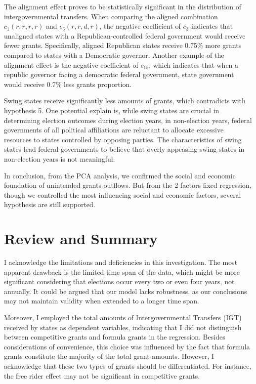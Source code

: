 
The alignment effect proves to be statistically significant in the distribution of intergovernmental transfers. When comparing the aligned combination $c_1(r, r, r, r)$ and $c_3(r, r, d, r)$, the negative coefficient of $c_3$ indicates that unaligned states with a Republican-controlled federal government would receive fewer grants. Specifically, aligned Republican states receive 0.75\% more grants compared to states with a Democratic governor. Another example of the alignment effect is the negative coefficient of $c_{15}$, which indicates that when a republic governor facing a democratic federal government, state government would receive 0.7\% less grants proportion.

Swing states receive significantly less amounts of grants, which contradicts with hypothesis 5. One potential explain is, while swing states are crucial in determining election outcomes during election years, in non-election years, federal governments of all political affiliations are reluctant to allocate excessive resources to states controlled by opposing parties. The characteristics of swing states lead federal governments to believe that overly appeasing swing states in non-election years is not meaningful.

In conclusion, from the PCA analysis, we confirmed the social and economic foundation of unintended grants outflows. But from the 2 factors fixed regression, though we controlled the most influencing social and economic factors, several hypothesis are still supported.

\section{Review and Summary}

I acknowledge the limitations and deficiencies in this investigation. The most apparent drawback is the limited time span of the data, which might be more significant considering that elections occur every two or even four years, not annually. It could be argued that our model lacks robustness, as our conclusions may not maintain validity when extended to a longer time span.

Moreover, I employed the total amounts of Intergovernmental Transfers (IGT) received by states as dependent variables, indicating that I did not distinguish between competitive grants and formula grants in the regression. Besides considerations of convenience, this choice was influenced by the fact that formula grants constitute the majority of the total grant amounts. However, I acknowledge that these two types of grants should be differentiated. For instance, the free rider effect may not be significant in competitive grants.

